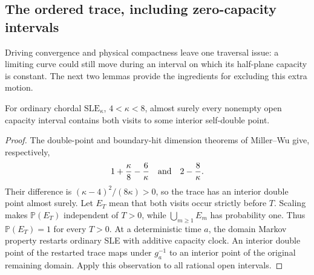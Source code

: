 \subsection{The ordered trace, including zero-capacity intervals}

Driving convergence and physical compactness leave one traversal issue:
a limiting curve could still move during an interval on which its
half-plane capacity is constant.  The next two lemmas provide the
ingredients for excluding this extra motion.

\begin{lemma}
\label{chordal:dense-doubles}
For ordinary chordal $\mathrm{SLE}_\kappa$, $4<\kappa<8$, almost surely
every nonempty open capacity interval contains both visits to some
interior self-double point.
\end{lemma}
\begin{proof}
The double-point and boundary-hit dimension theorems of Miller--Wu
\cite[Theorem~1.1 and Corollary~1.7]{MillerWu2017} give, respectively,
\[
 1+\frac\kappa8-\frac6\kappa
 \quad\hbox{and}\quad 2-\frac8\kappa.
\]
Their difference is $(\kappa-4)^2/(8\kappa)>0$, so the trace has
an interior double point almost surely.  Let $E_T$ mean that both
visits occur strictly before $T$.  Scaling makes $\mathbb P(E_T)$
independent of $T>0$, while $\bigcup_{m\ge1}E_m$ has probability one.
Thus $\mathbb P(E_T)=1$ for every $T>0$.  At a deterministic time $a$,
the domain Markov property restarts ordinary SLE with additive
capacity clock.  An interior double point of the restarted trace
maps under $g_a^{-1}$ to an interior point of the original remaining
domain.  Apply this observation to all rational open intervals.
\end{proof}

